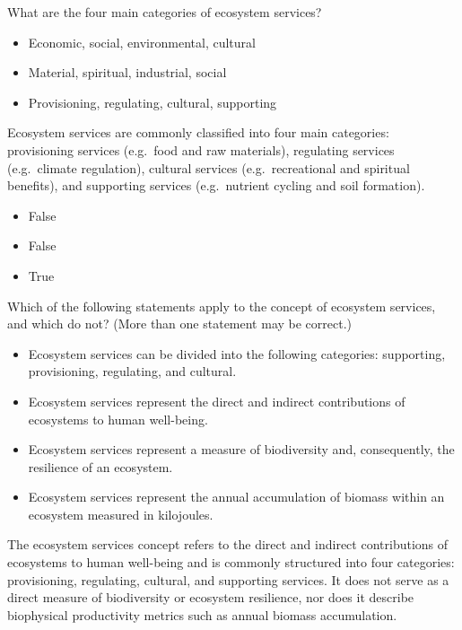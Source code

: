 \documentclass[
  a4paper,
  DIV=11,
  numbers=noendperiod,
  oneside,
  openany]{scrreprt}
\providecommand{\tightlist}{%
  \setlength{\itemsep}{0pt}\setlength{\parskip}{0pt}}
\begin{document}
What are the four main categories of ecosystem services?

\begin{itemize}
\tightlist
\item[$\square$]
  Economic, social, environmental, cultural
\item[$\square$]
  Material, spiritual, industrial, social
\item[$\square$]
  Provisioning, regulating, cultural, supporting
\end{itemize}

Ecosystem services are commonly classified into four main categories:
provisioning services (e.g.~food and raw materials), regulating services
(e.g.~climate regulation), cultural services (e.g.~recreational and
spiritual benefits), and supporting services (e.g.~nutrient cycling and
soil formation).

\begin{itemize}
\tightlist
\item
  False
\item
  False
\item
  True
\end{itemize}

Which of the following statements apply to the concept of ecosystem
services, and which do not? (More than one statement may be correct.)

\begin{itemize}
\tightlist
\item[$\square$]
  Ecosystem services can be divided into the following categories:
  supporting, provisioning, regulating, and cultural.
\item[$\square$]
  Ecosystem services represent the direct and indirect contributions of
  ecosystems to human well-being.
\item[$\square$]
  Ecosystem services represent a measure of biodiversity and,
  consequently, the resilience of an ecosystem.
\item[$\square$]
  Ecosystem services represent the annual accumulation of biomass within
  an ecosystem measured in kilojoules.
\end{itemize}

The ecosystem services concept refers to the direct and indirect
contributions of ecosystems to human well-being and is commonly
structured into four categories: provisioning, regulating, cultural, and
supporting services. It does not serve as a direct measure of
biodiversity or ecosystem resilience, nor does it describe biophysical
productivity metrics such as annual biomass accumulation.
\end{document}
